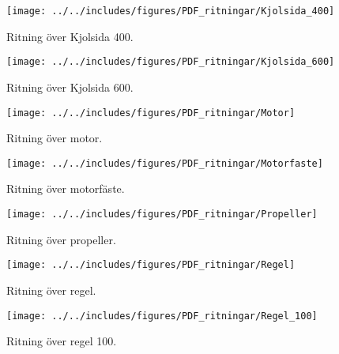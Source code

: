 \begin{landscape}
\begin{figure}[htbp!]
\centering
\texttt{[image: ../../includes/figures/PDF\_ritningar/Kjolsida\_400]}
\caption{Ritning över Kjolsida 400.}
\label{fig:Kjolsida_400}
\end{figure}
\end{landscape}

\begin{landscape}
\begin{figure}[htbp!]
\centering
\texttt{[image: ../../includes/figures/PDF\_ritningar/Kjolsida\_600]}
\caption{Ritning över Kjolsida 600.}
\label{fig:Kjolsida_600}
\end{figure}
\end{landscape}

\begin{landscape}
\begin{figure}[htbp!]
\centering
\texttt{[image: ../../includes/figures/PDF\_ritningar/Motor]}
\caption{Ritning över motor.}
\label{fig:motor}
\end{figure}
\end{landscape}

\begin{landscape}
\begin{figure}[htbp!]
\centering
\texttt{[image: ../../includes/figures/PDF\_ritningar/Motorfaste]}
\caption{Ritning över motorfäste.}
\label{fig:motorfaste}
\end{figure}
\end{landscape}

\begin{landscape}
\begin{figure}[htbp!]
\centering
\texttt{[image: ../../includes/figures/PDF\_ritningar/Propeller]}
\caption{Ritning över propeller.}
\label{fig:propeller}
\end{figure}
\end{landscape}

\begin{landscape}
\begin{figure}[htbp!]
\centering
\texttt{[image: ../../includes/figures/PDF\_ritningar/Regel]}
\caption{Ritning över regel.}
\label{fig:regel}
\end{figure}
\end{landscape}

\begin{landscape}
\begin{figure}[htbp!]
\centering
\texttt{[image: ../../includes/figures/PDF\_ritningar/Regel\_100]}
\caption{Ritning över regel 100.}
\label{fig:regel_100}
\end{figure}
\end{landscape}

